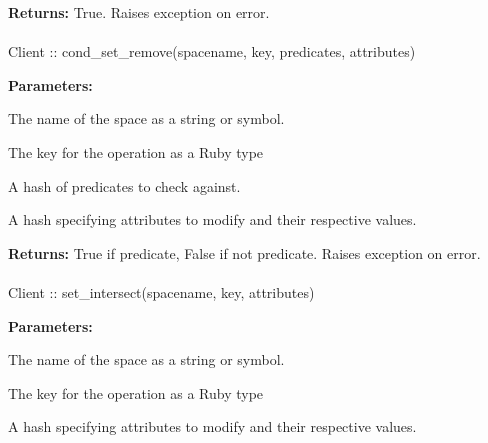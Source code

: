 \noindent\textbf{Returns:}
True.  Raises exception on error.

\paragraph{}
\label{api:ruby:cond_set_remove}
\begin{rubycode}
Client :: cond_set_remove(spacename, key, predicates, attributes)
\end{rubycode}


\noindent\textbf{Parameters:}
\begin{description}[labelindent=\widthof{{\code{predicates}}},leftmargin=*,noitemsep,nolistsep,align=right]
\item[\code{spacename}] The name of the space as a string or symbol.
\item[\code{key}] The key for the operation as a Ruby type
\item[\code{predicates}] A hash of predicates to check against.
\item[\code{attributes}] A hash specifying attributes to modify and their respective values.
\end{description}

\noindent\textbf{Returns:}
True if predicate, False if not predicate.  Raises exception on error.

\paragraph{}
\label{api:ruby:set_intersect}
\begin{rubycode}
Client :: set_intersect(spacename, key, attributes)
\end{rubycode}


\noindent\textbf{Parameters:}
\begin{description}[labelindent=\widthof{{\code{attributes}}},leftmargin=*,noitemsep,nolistsep,align=right]
\item[\code{spacename}] The name of the space as a string or symbol.
\item[\code{key}] The key for the operation as a Ruby type
\item[\code{attributes}] A hash specifying attributes to modify and their respective values.
\end{description}

